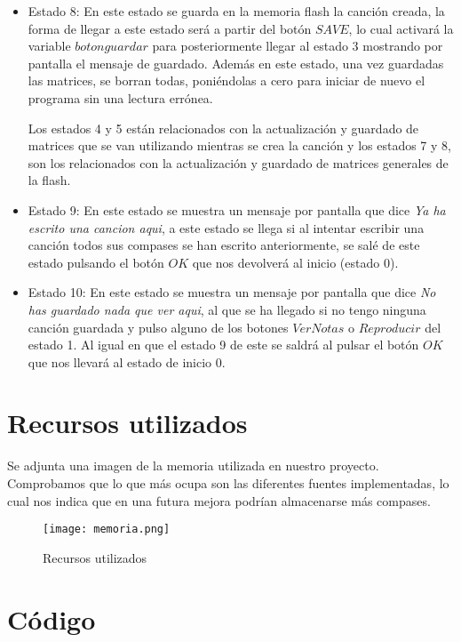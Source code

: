 \documentclass[12pt,a4paper]{article}
\begin{document}
\begin{itemize}
\item Estado 8: En este estado se guarda en la memoria flash la canción creada, la forma de llegar a este estado será a  partir del botón $SAVE$, lo cual activará la variable $botonguardar$ para posteriormente llegar al estado 3 mostrando por pantalla el mensaje de guardado. Además en este estado, una vez guardadas las matrices, se borran todas, poniéndolas a cero para iniciar de nuevo el programa sin una lectura errónea.

Los estados 4 y 5 están relacionados con la actualización y guardado de matrices que se van utilizando mientras se crea la canción y los estados 7 y 8, son los relacionados con la actualización y guardado de matrices generales de la flash.

\item Estado 9: En este estado se muestra un mensaje por pantalla que dice \textit{Ya ha escrito una cancion aqui}, a este estado se llega si al intentar escribir una canción todos sus compases se han escrito anteriormente, se salé de este estado pulsando el botón $OK$ que nos devolverá al inicio (estado 0).

\item Estado 10: En este estado se muestra un mensaje por pantalla que dice \textit{No has guardado nada que ver aqui}, al que se ha llegado si no tengo ninguna canción guardada y pulso alguno de los botones $VerNotas$ o $Reproducir$ del estado 1. Al igual en que el estado 9 de este se saldrá al pulsar el botón $OK$ que nos llevará al estado de inicio 0.

\end{itemize}



\section{Recursos utilizados}
Se adjunta una imagen de la memoria utilizada en nuestro proyecto. Comprobamos que lo que más ocupa son las diferentes fuentes implementadas, lo cual nos indica que en una futura mejora podrían almacenarse más compases.

\begin{figure}[h!]
\centering
  \texttt{[image: memoria.png]}
  \caption{Recursos utilizados}
  \label{fig:img1}
\end{figure}


\section{Código}
\end{document}
